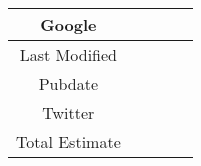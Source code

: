 \begin{table}[]
\begin{tabular}{|c|l|l|l|l|}
Google                                                            &                                                                                                               &                                                                                                &                                   &                                       \\ \hline
Last Modified                                                     & \multicolumn{1}{c|}{}                                                                                         & \multicolumn{1}{c|}{}                                                                          & \multicolumn{1}{c|}{}             & \multicolumn{1}{c|}{}                 \\ \hline
Pubdate                                                           & \multicolumn{1}{c|}{}                                                                                         & \multicolumn{1}{c|}{}                                                                          & \multicolumn{1}{c|}{}             & \multicolumn{1}{c|}{}                 \\ \hline
Twitter                                                           &                                                                                                               &                                                                                                &                                   &                                       \\ \hline
Total Estimate                                                    &                                                                                                               &                                                                                                &                                   &                                       \\ \hline
\end{tabular}
\end{table}
